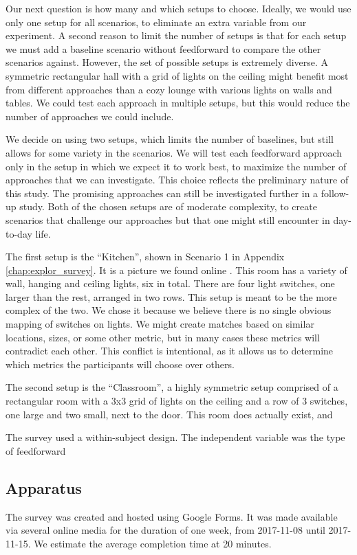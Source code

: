     Our next question is how many and which setups to choose. Ideally, we would use only one setup for all scenarios, to eliminate an extra variable from our experiment. A second reason to limit the number of setups is that for each setup we must add a baseline scenario without feedforward to compare the other scenarios against. However, the set of possible setups is extremely diverse. A symmetric rectangular hall with a grid of lights on the ceiling might benefit most from different approaches than a cozy lounge with various lights on walls and tables. We could test each approach in multiple setups, but this would reduce the number of approaches we could include.
    
    We decide on using two setups, which limits the number of baselines, but still allows for some variety in the scenarios. We will test each feedforward approach only in the setup in which we expect it to work best, to maximize the number of approaches that we can investigate. This choice reflects the preliminary nature of this study. The promising approaches can still be investigated further in a follow-up study. Both of the chosen setups are of moderate complexity, to create scenarios that challenge our approaches but that one might still encounter in day-to-day life. 
    
    The first setup is the ``Kitchen'', shown in Scenario 1 in Appendix \ref{chap:explor_survey}. It is a picture we found online \cite{FileTROY82:online}. This room has a variety of wall, hanging and ceiling lights, six in total. There are four light switches, one larger than the rest, arranged in two rows. This setup is meant to be the more complex of the two. We chose it because we believe there is no single obvious mapping of switches on lights. We might create matches based on similar locations, sizes, or some other metric, but in many cases these metrics will contradict each other. This conflict is intentional, as it allows us to determine which metrics the participants will choose over others.
    
    The second setup is the ``Classroom'', a highly symmetric setup comprised of a rectangular room with a 3x3 grid of lights on the ceiling and a row of 3 switches, one large and two small, next to the door. This room does actually exist, and 
    
    The survey used a within-subject design. The independent variable was the type of feedforward
    \todo{}

    \subsection{Apparatus} \label{subsec:explor:survey:apparatus}
    The survey was created and hosted using Google Forms. It was made available via several online media for the duration of one week, from 2017-11-08 until 2017-11-15. We estimate the average completion time at 20 minutes.

